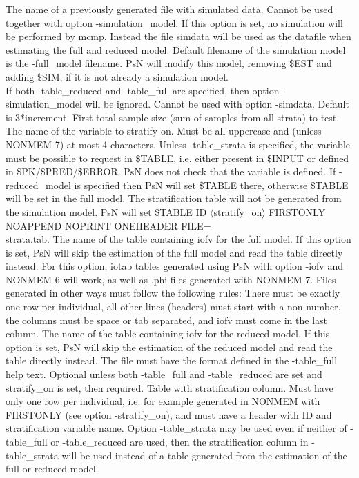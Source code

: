 \begin{optionlist}
\nextopt
{}
The name of a previously generated file with simulated data. Cannot be used together with option -simulation\_model. If this option is set, no simulation will be performed by mcmp. Instead the file simdata will be used as the datafile when estimating the full and reduced model. 
\nextopt
{}
Default filename of the simulation model is the -full\_model filename. PsN will modify this model, removing \$EST and adding \$SIM, if it is not already a simulation model. \\If both -table\_reduced and -table\_full are specified, then option -simulation\_model will be ignored. Cannot be used with option -simdata.	
\nextopt
\newpage
{}
Default is 3*increment. First total sample size (sum of samples from all strata) to test. 
\nextopt
{}
The name of the variable to stratify on. Must be all uppercase and (unless NONMEM 7) at most 4 characters. 
Unless -table\_strata is specified, the variable must be possible to request in \$TABLE, i.e. either present in \$INPUT or defined in \$PK/\$PRED/\$ERROR. PsN does not check that the variable is defined. If -reduced\_model is specified then PsN will set \$TABLE there, otherwise \$TABLE will be set in the full model. The stratification table will not be generated from the simulation model. PsN will set \$TABLE ID $\langle$stratify\_on$\rangle$ FIRSTONLY NOAPPEND NOPRINT ONEHEADER FILE=\\strata.tab. 
\nextopt
{}
The name of the table containing iofv for the full model. If this option is set, PsN will skip the estimation of the full model and read the table directly instead. For this option, iotab tables generated using PsN with option -iofv and NONMEM 6 will work, as well as .phi-files generated with NONMEM 7. Files generated in other ways must follow the following rules: There must be exactly one row per individual, all other lines (headers) must start with a non-number, the columns must be space or tab separated, and iofv must come in the last column. 
\nextopt
{}
The name of the table containing iofv for the reduced model. If this option is set, PsN will skip the estimation of the reduced model and read the table directly instead. The file must have the format defined in the -table\_full help text. 
\nextopt
{}
Optional unless both -table\_full and -table\_reduced are set and stratify\_on is set, then required. Table with stratification column. Must have only one row per individual, i.e. for example generated in NONMEM with FIRSTONLY (see option -stratify\_on), and must have a header with ID and stratification variable name. Option -table\_strata may be used even if neither of -table\_full or -table\_reduced are used, then the stratification column in -table\_strata will be used instead of a table generated from the estimation of the full or reduced model. 

\end{optionlist}
